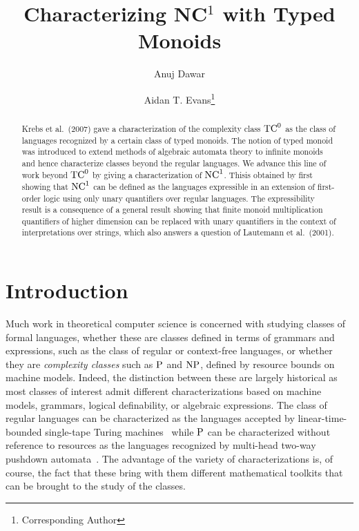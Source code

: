 \documentclass[a4paper,UKenglish,cleveref, autoref, thm-restate, anonymous]{lipics-v2021}
\title{Characterizing NC${}^1$ with Typed Monoids} %
\author{Anuj Dawar}{Department of Computer Science and Technology, University of Cambridge, United Kingdom \and \url{https://www.cl.cam.ac.uk/~ad260/} }{anuj.dawar@cl.cam.ac.uk}{https://orcid.org/0000-0003-4014-8248}{(Optional) author-specific funding acknowledgements}%
\author{Aidan T. Evans\footnote{Corresponding Author}}{Department of Computer Science and Technology, University of Cambridge, United Kingdom \and \url{https://www.aidantevans.com/} }{ate26@cam.ac.uk}{https://orcid.org/0009-0007-9084-3608}{[funding]}
\begin{document}


\maketitle

\begin{abstract}
Krebs et al.~(2007) gave a characterization of the complexity class $\mathrm{TC}^0$ as the class of languages recognized by a certain class of typed monoids.  The notion of typed monoid was introduced to extend methods of algebraic automata theory to infinite monoids and hence characterize classes beyond the regular languages.  We advance this line of work beyond $\mathrm{TC}^0$ by giving a characterization of $\mathrm{NC}^1$.  Thisis obtained by first showing that $\mathrm{NC}^1$ can be defined as the languages expressible in an extension of first-order logic using only unary quantifiers over regular languages.  The expressibility result is a consequence of a general result showing that finite monoid multiplication quantifiers of higher dimension can be replaced with unary quantifiers in the context of interpretations over strings, which also answers a question of Lautemann et al.~(2001).
\end{abstract}

\newpage

\section{Introduction}


Much work in theoretical computer science is concerned with studying classes of formal languages, whether these are classes defined in terms of grammars and expressions, such as the class of regular or context-free languages, or whether they are \emph{complexity classes} such as $\mathrm{P}$ and $\mathrm{NP}$, defined by resource bounds on machine models.  Indeed, the distinction between these are largely historical as most classes of interest admit different characterizations based on machine models, grammars, logical definability, or algebraic expressions. The class of regular languages can be characterized as the languages accepted by linear-time-bounded single-tape Turing machines~\cite{hennie1965one} while $\mathrm{P}$ can be characterized without reference to resources as the languages recognized by multi-head two-way pushdown automata~\cite{cook1971characterizations}.  The advantage of the variety of characterizations is, of course, the fact that these bring with them different mathematical toolkits that can be brought to the study of the classes.
\end{document}
